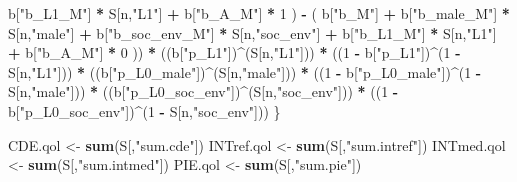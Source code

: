 \documentclass[
]{book}
\newenvironment{Shaded}{\begin{snugshade}}{\end{snugshade}}
\newcommand{\DecValTok}[1]{\textcolor[rgb]{0.00,0.00,0.81}{#1}}
\newcommand{\FunctionTok}[1]{\textcolor[rgb]{0.13,0.29,0.53}{\textbf{#1}}}
\newcommand{\NormalTok}[1]{#1}
\newcommand{\OtherTok}[1]{\textcolor[rgb]{0.56,0.35,0.01}{#1}}
\newcommand{\SpecialCharTok}[1]{\textcolor[rgb]{0.81,0.36,0.00}{\textbf{#1}}}
\newcommand{\StringTok}[1]{\textcolor[rgb]{0.31,0.60,0.02}{#1}}
\begin{document}
\begin{Shaded}
\begin{Highlighting}[]
\NormalTok{            b[}\StringTok{"b\_L1\_M"}\NormalTok{] }\SpecialCharTok{*}\NormalTok{ S[n,}\StringTok{"L1"}\NormalTok{] }\SpecialCharTok{+}
\NormalTok{            b[}\StringTok{"b\_A\_M"}\NormalTok{] }\SpecialCharTok{*} \DecValTok{1}\NormalTok{ ) }\SpecialCharTok{{-}} 
\NormalTok{          ( b[}\StringTok{"b\_M"}\NormalTok{] }\SpecialCharTok{+} 
\NormalTok{              b[}\StringTok{"b\_male\_M"}\NormalTok{] }\SpecialCharTok{*}\NormalTok{ S[n,}\StringTok{"male"}\NormalTok{] }\SpecialCharTok{+} 
\NormalTok{              b[}\StringTok{"b\_soc\_env\_M"}\NormalTok{] }\SpecialCharTok{*}\NormalTok{ S[n,}\StringTok{"soc\_env"}\NormalTok{] }\SpecialCharTok{+} 
\NormalTok{              b[}\StringTok{"b\_L1\_M"}\NormalTok{] }\SpecialCharTok{*}\NormalTok{ S[n,}\StringTok{"L1"}\NormalTok{] }\SpecialCharTok{+}
\NormalTok{              b[}\StringTok{"b\_A\_M"}\NormalTok{] }\SpecialCharTok{*} \DecValTok{0}\NormalTok{ )) }\SpecialCharTok{*} 
\NormalTok{      ((b[}\StringTok{"p\_L1"}\NormalTok{])}\SpecialCharTok{\^{}}\NormalTok{(S[n,}\StringTok{"L1"}\NormalTok{])) }\SpecialCharTok{*}
\NormalTok{      ((}\DecValTok{1} \SpecialCharTok{{-}}\NormalTok{ b[}\StringTok{"p\_L1"}\NormalTok{])}\SpecialCharTok{\^{}}\NormalTok{(}\DecValTok{1} \SpecialCharTok{{-}}\NormalTok{ S[n,}\StringTok{"L1"}\NormalTok{])) }\SpecialCharTok{*}
\NormalTok{      ((b[}\StringTok{"p\_L0\_male"}\NormalTok{])}\SpecialCharTok{\^{}}\NormalTok{(S[n,}\StringTok{"male"}\NormalTok{])) }\SpecialCharTok{*} 
\NormalTok{      ((}\DecValTok{1} \SpecialCharTok{{-}}\NormalTok{ b[}\StringTok{"p\_L0\_male"}\NormalTok{])}\SpecialCharTok{\^{}}\NormalTok{(}\DecValTok{1} \SpecialCharTok{{-}}\NormalTok{ S[n,}\StringTok{"male"}\NormalTok{])) }\SpecialCharTok{*} 
\NormalTok{      ((b[}\StringTok{"p\_L0\_soc\_env"}\NormalTok{])}\SpecialCharTok{\^{}}\NormalTok{(S[n,}\StringTok{"soc\_env"}\NormalTok{])) }\SpecialCharTok{*}
\NormalTok{      ((}\DecValTok{1} \SpecialCharTok{{-}}\NormalTok{ b[}\StringTok{"p\_L0\_soc\_env"}\NormalTok{])}\SpecialCharTok{\^{}}\NormalTok{(}\DecValTok{1} \SpecialCharTok{{-}}\NormalTok{ S[n,}\StringTok{"soc\_env"}\NormalTok{])) }
\NormalTok{    \}}
  
\NormalTok{  CDE.qol }\OtherTok{\textless{}{-}} \FunctionTok{sum}\NormalTok{(S[,}\StringTok{"sum.cde"}\NormalTok{])}
\NormalTok{  INTref.qol }\OtherTok{\textless{}{-}} \FunctionTok{sum}\NormalTok{(S[,}\StringTok{"sum.intref"}\NormalTok{])}
\NormalTok{  INTmed.qol }\OtherTok{\textless{}{-}} \FunctionTok{sum}\NormalTok{(S[,}\StringTok{"sum.intmed"}\NormalTok{])}
\NormalTok{  PIE.qol }\OtherTok{\textless{}{-}} \FunctionTok{sum}\NormalTok{(S[,}\StringTok{"sum.pie"}\NormalTok{])}
  

\end{Highlighting}
\end{Shaded}
\end{document}
